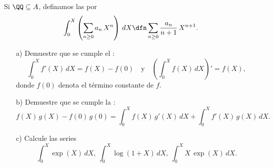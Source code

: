 \begin{ejercicio}
  Si $\QQ \subseteq A$, definamos las  por
  $$\int_0^X \left(\sum_{n\ge 0} a_n\,X^n\right) \, dX \dfn \sum_{n\ge 0} \frac{a_n}{n+1}\,X^{n+1}.$$

  \begin{enumerate}
  \item[a)] Demuestre que se cumple el :
    $$\int_0^X f' (X)\,dX = f (X) - f (0) \quad\text{y}\quad \left(\int_0^X f (X)\,dX\right)' = f (X),$$
    donde $f (0)$ denota el término constante de $f$.

  \item[b)] Demuestre que se cumple la :
    $$f (X)\,g (X) - f (0)\,g (0) = \int_0^X f (X)\,g' (X)\,dX + \int_0^X f' (X)\,g (X)\,dX.$$

  \item[c)] Calcule las series
    $$\int_0^X \exp (X)\,dX, ~ \int_0^X \log (1+X)\,dX, ~ \int_0^X X\,\exp (X)\,dX.$$
  \end{enumerate}
\end{ejercicio}

